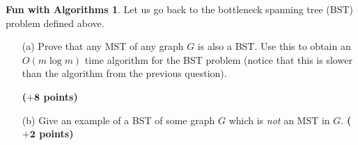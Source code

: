 \documentclass{article}
\theoremstyle{definition}
\newtheorem*{fun}{Fun with Algorithms}
\newcommand{\grade}[1]{\hfill{\textbf{($\mathbf{#1}$ points)}}}
\begin{document}
\smallskip

\begin{fun}
	Let us go back to the bottleneck spanning tree (BST) problem defined above. 
	\begin{enumerate}
		\item[(a)] Prove that any MST of any graph $G$ is also a BST. Use this to obtain an $O(m\log{m})$ time algorithm for the BST problem (notice that this is  slower than the algorithm from the previous question). 
		
		\grade{+8}
		\item[(b)] Give an example of a BST of some graph $G$ which is \emph{not} an MST in $G$. \grade{+2}
	\end{enumerate}
 \end{fun}
\end{document}
